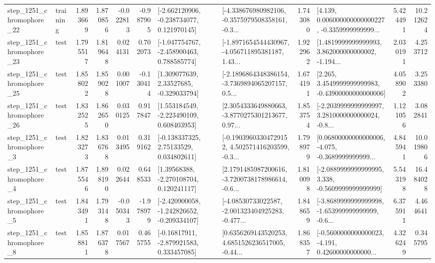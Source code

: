 \begin{tabular}{llrrrrllrlrr}
 step\_1251\_chromophore\_22 &  training &      1.893669 &    1.870856 &     -0.022813 & -0.987905 &   [-2.662120906, -0.238734077, 0.121970145] &  [-4.338676980982106, -0.3575979508358161, -0.3... &       1.743080 &  [4.139, 0.006000000000000227, -0.3359999999999... &            5.424491 &         10.212624 \\
 step\_1251\_chromophore\_23 &      test &      1.795517 &    1.819648 &      0.024131 &  0.702073 &   [-1.047754767, -2.458900463, 0.788585774] &  [-1.8971654544430967, -4.056711895381187, 1.43... &       1.922962 &  [1.4819999999999993, 3.862000000000002, -1.194... &            2.030191 &          4.253712 \\
 step\_1251\_chromophore\_25 &      test &      1.858022 &    1.859028 &      0.001007 & -0.130414 &     [1.309077639, 2.33527685, -0.329033794] &  [-2.1896864348386154, -3.7369894065207157, 0.5... &       1.674191 &  [2.265, 3.4549999999999983, -0.43900000000000006] &            4.058902 &          3.253380 \\
 step\_1251\_chromophore\_26 &      test &      1.832525 &    1.862650 &      0.030125 &  0.917847 &    [1.553184549, -2.223490109, 0.608403953] &  [2.3054333649880663, -3.8770275301213677, 0.97... &       1.853754 &  [-2.2039999999999997, 3.2810000000000024, -0.8... &            1.121056 &          3.082841 \\
  step\_1251\_chromophore\_3 &      test &      1.823273 &    1.836768 &      0.013495 &  0.319162 &     [-0.138337325, 2.75133529, 0.034802611] &  [-0.19039603304729152, 4.502571416203599, -0.3... &       1.798979 &  [0.06800000000000006, -4.075, -0.3689999999999... &            4.845941 &         10.019806 \\
  step\_1251\_chromophore\_4 &      test &      1.875546 &    1.898190 &      0.022644 &  0.648533 &     [1.39568388, -2.270108704, 0.120241117] &  [2.1791485987200616, -3.7200738178986614, -0.6... &       1.810098 &  [-2.0889999999999995, 3.338, -0.5609999999999999] &            5.543198 &         16.484028 \\
  step\_1251\_chromophore\_5 &      test &      1.843491 &    1.793148 &     -0.050343 & -1.978979 &  [-2.420900058, -1.242826652, -0.209334107] &  [-4.08530733022587, -2.001323404925283, -0.477... &       1.848659 &  [-3.8689999999999998, -1.653999999999999, -0.6... &            6.375911 &          4.464641 \\
  step\_1251\_chromophore\_8 &      test &      1.858811 &    1.876378 &      0.017567 &  0.465755 &    [-0.16817911, -2.879921583, 0.333457085] &  [0.6356269143520253, 4.6851526236517005, -0.44... &       1.868357 &  [-0.5600000000000023, -4.191, 0.42600000000000... &            4.326249 &          0.345795 \\

\end{tabular}
